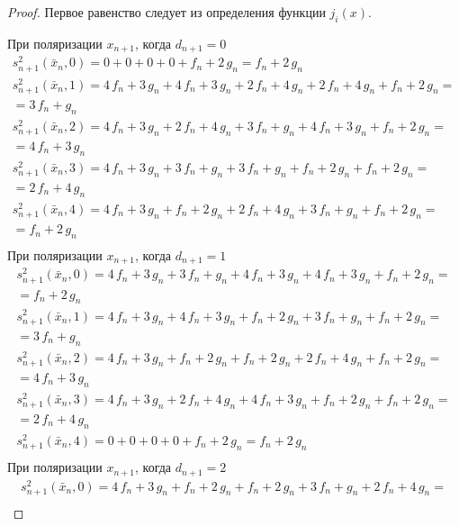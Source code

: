 \documentclass[bibliography=totoc, a4paper, 14pt]{extarticle}
\begin{document}
 \begin{proof}

Первое равенство следует из определения функции $j_i(x)$.

При поляризации $x_{n+1}$, когда $d_{n+1} = 0$
$$\begin{array}{l}
s_{n+1}^2(\bar{x}_n, 0) = 0 + 0 + 0 + 0 + f_n + 2\,g_n = f_n + 2\,g_n \\
s_{n+1}^2(\bar{x}_n, 1) = 4\,f_n + 3\,g_n + 4\,f_n + 3\,g_n + 2\,f_n + 4\,g_n + 2\,f_n + 4\,g_n + f_n + 2\,g_n =\\
= 3\,f_n + g_n \\
s_{n+1}^2(\bar{x}_n, 2) = 4\,f_n + 3\,g_n + 2\,f_n + 4\,g_n + 3\,f_n + g_n + 4\,f_n + 3\,g_n + f_n + 2\,g_n =\\
= 4\,f_n + 3\,g_n \\
s_{n+1}^2(\bar{x}_n, 3) = 4\,f_n + 3\,g_n + 3\,f_n + g_n + 3\,f_n + g_n + f_n + 2\,g_n + f_n + 2\,g_n =\\
= 2\,f_n + 4\,g_n \\
s_{n+1}^2(\bar{x}_n, 4) = 4\,f_n + 3\,g_n + f_n + 2\,g_n + 2\,f_n + 4\,g_n + 3\,f_n + g_n + f_n + 2\,g_n =\\
= f_n + 2\,g_n \\
\end{array}$$
При поляризации $x_{n+1}$, когда $d_{n+1} = 1$
$$\begin{array}{l}
s_{n+1}^2(\bar{x}_n, 0) = 4\,f_n + 3\,g_n + 3\,f_n + g_n + 4\,f_n + 3\,g_n + 4\,f_n + 3\,g_n + f_n + 2\,g_n =\\
= f_n + 2\,g_n \\
s_{n+1}^2(\bar{x}_n, 1) = 4\,f_n + 3\,g_n + 4\,f_n + 3\,g_n + f_n + 2\,g_n + 3\,f_n + g_n + f_n + 2\,g_n =\\
= 3\,f_n + g_n \\
s_{n+1}^2(\bar{x}_n, 2) = 4\,f_n + 3\,g_n + f_n + 2\,g_n + f_n + 2\,g_n + 2\,f_n + 4\,g_n + f_n + 2\,g_n =\\
= 4\,f_n + 3\,g_n \\
s_{n+1}^2(\bar{x}_n, 3) = 4\,f_n + 3\,g_n + 2\,f_n + 4\,g_n + 4\,f_n + 3\,g_n + f_n + 2\,g_n + f_n + 2\,g_n =\\
= 2\,f_n + 4\,g_n \\
s_{n+1}^2(\bar{x}_n, 4) = 0 + 0 + 0 + 0 + f_n + 2\,g_n = f_n + 2\,g_n \\
\end{array}$$
При поляризации $x_{n+1}$, когда $d_{n+1} = 2$
$$\begin{array}{l}
s_{n+1}^2(\bar{x}_n, 0) = 4\,f_n + 3\,g_n + f_n + 2\,g_n + f_n + 2\,g_n + 3\,f_n + g_n + 2\,f_n + 4\,g_n =\\

\end{array}$$
\end{proof}
\end{document}
